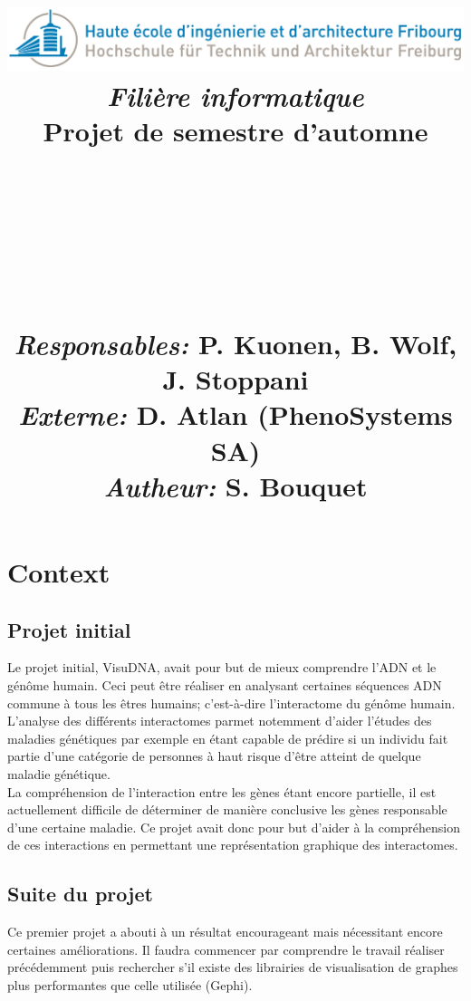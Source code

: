 \documentclass{article}
\title{
  \includegraphics[width=0.9\columnwidth]{Logo_HEIA}\\
  \vspace{1cm}
  \textmd{\textit{Filière informatique}} \\
  \vspace{2cm}
  \textmd{Projet de semestre d'automne}\\
  \textmd{\projDate}\\
  \vspace{1.5cm}
  \noindent\makebox[\linewidth]{\rule{\textwidth}{0.5pt}}\\
  \vspace{.5cm}
  \textmd{\textbf{\projName}}\\
  \textmd{\textbf{\docTitle}}\\
  \noindent\makebox[\linewidth]{\rule{\textwidth}{0.5pt}}\\
  \vspace{3cm}
  \textit{Responsables:} P. Kuonen, B. Wolf, J. Stoppani\\
  \vspace{1cm}
  \textit{Externe:} D. Atlan (PhenoSystems SA)\\
  \vspace{1cm}
  \textit{Autheur:} S. Bouquet
}
\date{} %
\begin{document}
\maketitle


 \newpage



\section{Context}
\subsection{Projet initial}
  Le projet initial, VisuDNA, avait pour but de mieux comprendre l'ADN et le génôme humain. Ceci peut être réaliser en analysant certaines séquences ADN commune à tous les êtres humains; c'est-à-dire l'interactome du génôme humain.  L'analyse des différents interactomes parmet notemment d'aider l'études des maladies génétiques par exemple en étant capable de prédire si un individu fait partie d'une catégorie de personnes à haut risque d'être atteint de quelque maladie génétique.
  \\
  La compréhension de l'interaction entre les gènes étant encore partielle, il est actuellement difficile de déterminer de manière conclusive les gènes responsable d'une certaine maladie. Ce projet avait donc pour but d'aider à la compréhension de ces interactions en permettant une représentation graphique des interactomes.
\cite{Sisto:2015}

\subsection{Suite du projet}
  Ce premier projet a abouti à un résultat encourageant mais nécessitant encore certaines améliorations. Il faudra commencer par comprendre le travail réaliser précédemment puis rechercher s'il existe des librairies de visualisation de graphes plus performantes que celle utilisée (Gephi).
\end{document}

